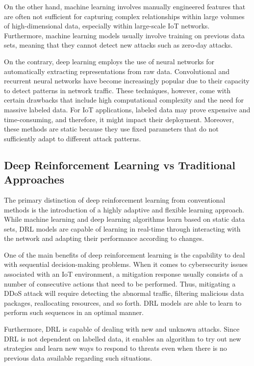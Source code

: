 \documentclass[12pt]{article}
\begin{document}
On the other hand, machine learning involves manually engineered features that are often not sufficient for capturing complex relationships within large volumes of high-dimensional data, especially within large-scale IoT networks. Furthermore, machine learning models usually involve training on previous data sets, meaning that they cannot detect new attacks such as zero-day attacks.

On the contrary, deep learning employs the use of neural networks for automatically extracting representations from raw data. Convolutional and recurrent neural networks have become increasingly popular due to their capacity to detect patterns in network traffic.
These techniques, however, come with certain drawbacks that include high computational complexity and the need for massive labeled data. For IoT applications, labeled data may prove expensive and time-consuming, and therefore, it might impact their deployment. Moreover, these methods are static because they use fixed parameters that do not sufficiently adapt to different attack patterns.
\subsection{Deep Reinforcement Learning vs Traditional Approaches}
The primary distinction of deep reinforcement learning from conventional methods is the introduction of a highly adaptive and flexible learning approach. While machine learning and deep learning algorithms learn based on static data sets, DRL\cite{almaraz} models are capable of learning in real-time through interacting with the network and adapting their performance according to changes.

One of the main benefits of deep reinforcement learning is the capability to deal with sequential decision-making problems. When it comes to cybersecurity issues associated with an IoT environment, a mitigation response usually consists of a number of consecutive actions that need to be performed. Thus, mitigating a DDoS attack will require detecting the abnormal traffic, filtering malicious data packages, reallocating resources, and so forth. DRL models are able to learn to perform such sequences in an optimal manner.

Furthermore, DRL is capable of dealing with new and unknown attacks. Since DRL is not dependent on labelled data, it enables an algorithm to try out new strategies and learn new ways to respond to threats even when there is no previous data available regarding such situations.
\end{document}
